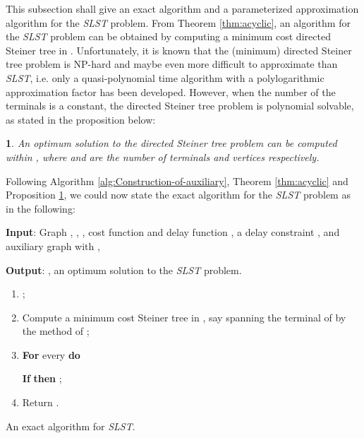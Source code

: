 \documentclass[english,runningheads,a4paper]{llncs}
\newtheorem{prop}[thm]{\protect\propositionname}
\providecommand{\propositionname}{Proposition}
\begin{document}
This subsection shall give an exact algorithm and a parameterized
approximation algorithm for the \emph{SLST} problem. From Theorem
\ref{thm:acyclic}, an algorithm for the \emph{SLST} problem can be
obtained by computing a minimum cost directed Steiner tree in .
Unfortunately, it is known that the (minimum) directed Steiner tree
problem is NP-hard and maybe even more difficult to approximate than
\emph{SLST}, i.e. only a quasi-polynomial time algorithm with a polylogarithmic
approximation factor has been developed\cite{charikar1998approximation}.
However, when the number of the terminals is a constant, the directed
Steiner tree problem is polynomial solvable, as stated in the proposition
below:
\begin{prop}
\label{prop:An-optimum-solution}\cite{guo2011parameterized}An optimum
solution to the directed Steiner tree problem can be computed within
, where  and  are the number
of terminals and vertices respectively.
\end{prop}
Following Algorithm \ref{alg:Construction-of-auxiliary}, Theorem
\ref{thm:acyclic} and Proposition \ref{prop:An-optimum-solution},
we could now state the exact algorithm for the \emph{SLST} problem
as in the following:

\begin{algorithm}
\textbf{Input}: Graph , , , cost
function and delay function 
, a delay constraint , and auxiliary graph  with ,

\textbf{Output}: , an optimum solution to the \emph{SLST} problem.
\begin{enumerate}
\item ;
\item Compute a minimum cost Steiner tree in , say  spanning the
terminal of  by the method of \cite{ding2007finding};
\item \textbf{For} every  \textbf{do}


\quad{}\textbf{If}  \textbf{then} ;

\item Return .
\end{enumerate}
\caption{\label{alg:An-exact-algorithm}An exact algorithm for \emph{SLST}.}


\end{algorithm}
\end{document}
